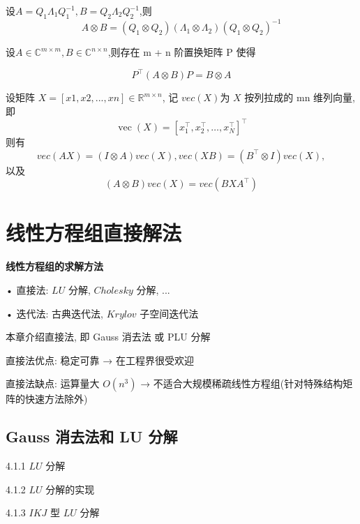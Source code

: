 \documentclass[12pt,a4paper]{article}
\begin{document}
\begin{corollary}
	设$A=Q_{1} \Lambda_{1} Q_{1}^{-1}, B=Q_{2} \Lambda_{2} Q_{2}^{-1}$,则
	$$
	A \otimes B=\left(Q_{1} \otimes Q_{2}\right)\left(\Lambda_{1} \otimes \Lambda_{2}\right)\left(Q_{1} \otimes Q_{2}\right)^{-1}
	$$	
\end{corollary}



\begin{theorem}
	设$A \in \mathbb{C}^{m \times m}, B \in \mathbb{C}^{n \times n}$,则存在 m + n 阶置换矩阵 P 使得
	
	$$
	P^{\top}(A \otimes B) P=B \otimes A
	$$
	
\end{theorem}



\begin{theorem}
	设矩阵 $X = [x1, x2, . . . , xn] ∈ \mathbb{R}^{
		m×n}$, 记 $vec(X)$为 $X$ 按列拉成的
	mn 维列向量, 即
	$$
	\operatorname{vec}(X)=\left[x_{1}^{\top}, x_{2}^{\top}, \ldots, x_{N}^{\top}\right]^{\top}
	$$
	则有
	$$vec(AX) = (I ⊗ A)vec(X), vec(XB) = (B^{\top}⊗ I)vec(X),$$
	以及
	$$(A ⊗ B)vec(X) = vec(BXA^{\top}
	)$$
\end{theorem}
\section{线性方程组直接解法}

{\bfseries 线性方程组的求解方法}

• 直接法: $LU$ 分解, $Cholesky$ 分解, ...

• 迭代法: 古典迭代法, $Krylov$ 子空间迭代法

本章介绍直接法, 即 Gauss 消去法 或 PLU 分解

直接法优点: 稳定可靠 → 在工程界很受欢迎

直接法缺点: 运算量大 $O(n^3)$ → 不适合大规模稀疏线性方程组(针对特殊结构矩阵的快速方法除外)

\subsection{Gauss 消去法和 LU 分解}

4.1.1 $LU$ 分解

4.1.2 $LU$ 分解的实现

4.1.3 $IKJ$ 型 $LU$ 分解
\end{document}
